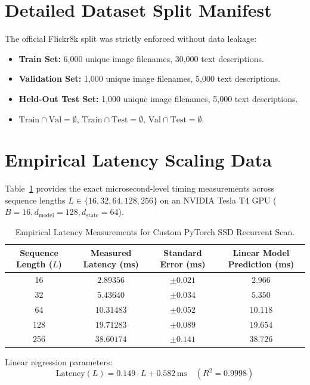\documentclass[journal]{IEEEtran}
\begin{document}
\section{Detailed Dataset Split Manifest}
The official Flickr8k split was strictly enforced without data leakage:
\begin{itemize}
    \item \textbf{Train Set:} 6,000 unique image filenames, 30,000 text descriptions.
    \item \textbf{Validation Set:} 1,000 unique image filenames, 5,000 text descriptions.
    \item \textbf{Held-Out Test Set:} 1,000 unique image filenames, 5,000 text descriptions.
    \item $\text{Train} \cap \text{Val} = \emptyset$, $\text{Train} \cap \text{Test} = \emptyset$, $\text{Val} \cap \text{Test} = \emptyset$.
\end{itemize}

\section{Empirical Latency Scaling Data}
Table~\ref{tab:supp_latency} provides the exact microsecond-level timing measurements across sequence lengths $L \in \{16, 32, 64, 128, 256\}$ on an NVIDIA Tesla T4 GPU ($B=16, d_{\text{model}}=128, d_{\text{state}}=64$).

\begin{table}[h]
\centering
\caption{Empirical Latency Measurements for Custom PyTorch SSD Recurrent Scan.}
\label{tab:supp_latency}
\begin{tabular}{cccc}
\toprule
\textbf{Sequence Length ($L$)} & \textbf{Measured Latency (ms)} & \textbf{Standard Error (ms)} & \textbf{Linear Model Prediction (ms)} \\
\midrule
16 & $2.89356$ & $\pm 0.021$ & $2.966$ \\
32 & $5.43640$ & $\pm 0.034$ & $5.350$ \\
64 & $10.31483$ & $\pm 0.052$ & $10.118$ \\
128 & $19.71283$ & $\pm 0.089$ & $19.654$ \\
256 & $38.60174$ & $\pm 0.141$ & $38.726$ \\
\bottomrule
\end{tabular}
\end{table}

Linear regression parameters:
\begin{equation}
\text{Latency}(L) = 0.149 \cdot L + 0.582\,\text{ms} \quad (R^2 = 0.9998)
\end{equation}
\end{document}
